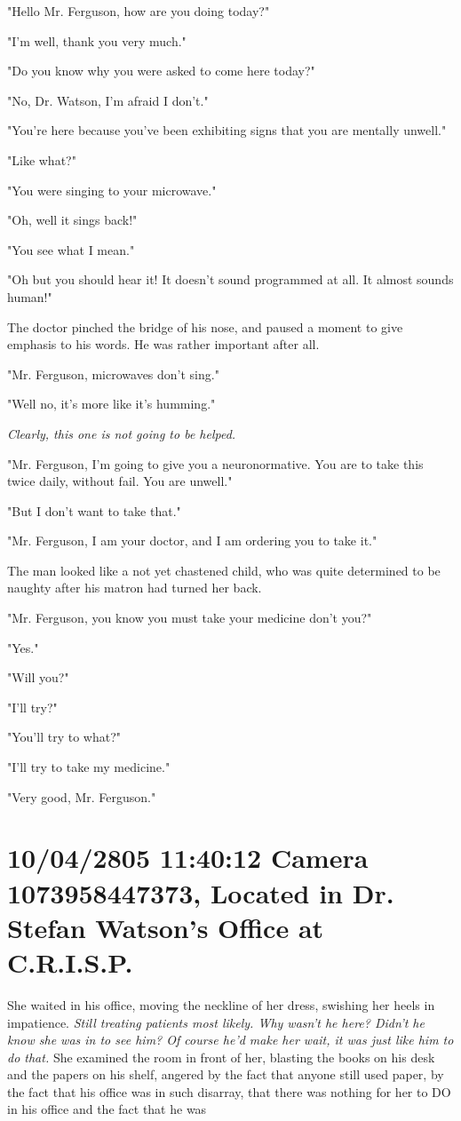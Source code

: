 \documentclass[12pt]{book}
\begin{document}
"Hello Mr. Ferguson, how are you doing today?"

"I'm well, thank you very much."

"Do you know why you were asked to come here today?"

"No, Dr. Watson, I'm afraid I don't."

"You're here because you've been exhibiting signs that you are mentally unwell."

"Like what?"

"You were singing to your microwave."

"Oh, well it sings back!"

"You see what I mean."

"Oh but you should hear it! It doesn't sound programmed at all. It almost sounds human!"

The doctor pinched the bridge of his nose, and paused a moment to give emphasis to his words. He was rather important after all.

"Mr. Ferguson, microwaves don't sing."

"Well no, it's more like it's humming."

\emph{Clearly, this one is not going to be helped.}

"Mr. Ferguson, I'm going to give you a neuronormative. You are to take this twice daily, without fail. You are unwell."

"But I don't want to take that."

"Mr. Ferguson, I am your doctor, and I am ordering you to take it."

The man looked like a not yet chastened child, who was quite determined to be naughty after his matron had turned her back.

"Mr. Ferguson, you know you must take your medicine don't you?"

"Yes."

"Will you?"

"I'll try?"

"You'll try to what?"

"I'll try to take my medicine."

"Very good, Mr. Ferguson."

\section*{10/04/2805 11:40:12 Camera 1073958447373, Located in Dr. Stefan Watson's Office at C.R.I.S.P.}
\label{sec:orgd267a1b}

She waited in his office, moving the neckline of her dress, swishing her heels in impatience. \emph{Still treating patients most likely. Why wasn't he here? Didn't he know she was in to see him? Of course he'd make her wait, it was just like him to do that.} She examined the room in front of her, blasting the books on his desk and the papers on his shelf, angered by the fact that anyone still used paper, by the fact that his office was in such disarray, that there was nothing for her to DO in his office and the fact that he was
\end{document}
